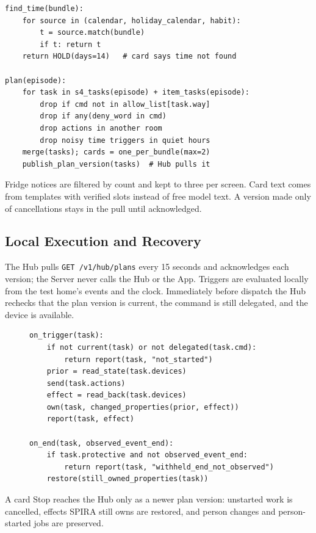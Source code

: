 \documentclass[conference]{IEEEtran}
\begin{document}
\noindent\begin{minipage}{\columnwidth}
\begin{lstlisting}
find_time(bundle):
    for source in (calendar, holiday_calendar, habit):
        t = source.match(bundle)
        if t: return t
    return HOLD(days=14)   # card says time not found

plan(episode):
    for task in s4_tasks(episode) + item_tasks(episode):
        drop if cmd not in allow_list[task.way]
        drop if any(deny_word in cmd)
        drop actions in another room
        drop noisy time triggers in quiet hours
    merge(tasks); cards = one_per_bundle(max=2)
    publish_plan_version(tasks)  # Hub pulls it
\end{lstlisting}
\end{minipage}
Fridge notices are filtered by count and kept to three per screen. Card text comes from templates with verified slots instead of free model text. A version made only of cancellations stays in the pull until acknowledged.

\subsection{Local Execution and Recovery}
The Hub pulls \texttt{GET /v1/hub/plans} every 15 seconds and acknowledges each version; the Server never calls the Hub or the App. Triggers are evaluated locally from the test home's events and the clock. Immediately before dispatch the Hub rechecks that the plan version is current, the command is still delegated, and the device is available.

\begin{figure}[!t]
\noindent\begin{minipage}{\columnwidth}
\begin{lstlisting}
on_trigger(task):
    if not current(task) or not delegated(task.cmd):
        return report(task, "not_started")
    prior = read_state(task.devices)
    send(task.actions)
    effect = read_back(task.devices)
    own(task, changed_properties(prior, effect))
    report(task, effect)

on_end(task, observed_event_end):
    if task.protective and not observed_event_end:
        return report(task, "withheld_end_not_observed")
    restore(still_owned_properties(task))
\end{lstlisting}
\end{minipage}
\end{figure}
A card Stop reaches the Hub only as a newer plan version: unstarted work is cancelled, effects SPIRA still owns are restored, and person changes and person-started jobs are preserved.
\end{document}
